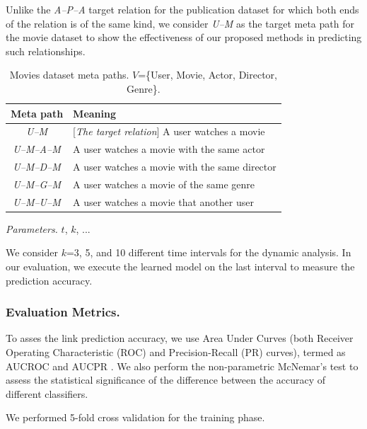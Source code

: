 Unlike the \textit{A--P--A} target relation for the publication dataset for which both ends of the relation is of the same kind, we consider \textit{U--M} as the target meta path for the movie dataset to show the effectiveness of our proposed methods in predicting such relationships.

\begin{table}[h]
\centering
\caption{Movies dataset meta paths. $V$=\{User, Movie, Actor, Director, Genre\}.}
\label{table_movies}\scriptsize
\begin{tabular}{|c|l|} \hline
\textbf{Meta path} & \textbf{Meaning} \\ \hline
\textit{U--M} & [\textit{The target relation}] A user watches a movie \\ \hline

\textit{U--M--A--M} & A user watches a movie with the same actor \\ \hline
\textit{U--M--D--M} & A user watches a movie with the same director \\ \hline
\textit{U--M--G--M} & A user watches a movie of the same genre \\ \hline
\textit{U--M--U--M} & A user watches a movie that another user  \\ \hline

\end{tabular}
\end{table}


\textit{Parameters.} $t$, $k$, ...

We consider $k$=3, 5, and 10 different time intervals for the dynamic analysis. In our evaluation, we execute the learned model on the last interval to measure the prediction accuracy.

\subsubsection{Evaluation Metrics.} 

To asses the link prediction accuracy, we use Area Under Curves (both Receiver Operating Characteristic (ROC) and Precision-Recall (PR) curves), termed as AUCROC and AUCPR \cite{davis2006relationship}. We also perform the non-parametric McNemar's test \cite{mcnemar1947note} to assess the statistical significance of the difference between the accuracy of different classifiers.

We performed 5-fold cross validation for the training phase.


